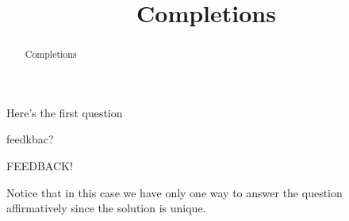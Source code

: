 \documentclass{ximera}
\title{Completions}
\begin{document}
\begin{abstract}
  Completions
\end{abstract}
\maketitle

\begin{example}
  \begin{question}
    Here's the first question
    \begin{multipleChoice}
    \end{multipleChoice}
    feedkbac?
    \begin{feedback}[correct]
      \begin{question}
        FEEDBACK!

        \begin{feedback}[correct]
          Notice that in this case we have only one way to answer the
          question affirmatively since the solution is unique.
        \end{feedback}
      \end{question}
    \end{feedback}
  \end{question}
\end{example}
\end{document}
